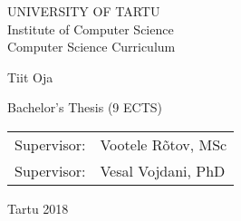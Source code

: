 \documentclass{style/thesis}
\begin{document}
\thispagestyle{empty}
\begin{center}

\large
UNIVERSITY OF TARTU\\[2mm]
Institute of Computer Science\\
Computer Science Curriculum\\[2mm]

\vspace{25mm}

\Large Tiit Oja

\vspace{4mm}

\huge \articleName

\vspace{20mm}

\Large Bachelor's Thesis (9 ECTS)

\end{center}

\vspace{2mm}

\begin{flushright}
 {
 \setlength{\extrarowheight}{5pt}
 \begin{tabular}{r l} 
  \sffamily Supervisor: & \sffamily Vootele Rõtov, MSc \\
  \sffamily Supervisor: & \sffamily Vesal Vojdani, PhD
 \end{tabular}
 }
\end{flushright}

\vfill
\centerline{Tartu 2018}


\pagebreak
{}%

\pagebreak
\end{document}
